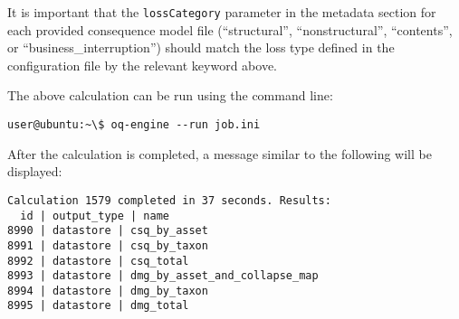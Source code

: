 It is important that the \Verb+lossCategory+ parameter in the metadata section
for each provided consequence model file (``structural'', ``nonstructural'',
``contents'', or ``business\_interruption'') should match the loss type
defined in the configuration file by the relevant keyword above.

The above calculation can be run using the command line:

\begin{verbatim}
user@ubuntu:~\$ oq-engine --run job.ini
\end{verbatim}

After the calculation is completed, a message similar to the following will be
displayed:

\begin{verbatim}
Calculation 1579 completed in 37 seconds. Results:
  id | output_type | name
8990 | datastore | csq_by_asset
8991 | datastore | csq_by_taxon
8992 | datastore | csq_total
8993 | datastore | dmg_by_asset_and_collapse_map
8994 | datastore | dmg_by_taxon
8995 | datastore | dmg_total
\end{verbatim}